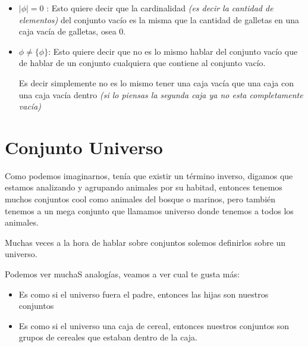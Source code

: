 \documentclass[12pt]{report}                                    %
\begin{document}
        \begin{itemize}
            \item $|\phi| = 0$ : 
                    Esto quiere decir que la cardinalidad \emph{(es decir
                    la cantidad de elementos)} del conjunto vacío es la misma que 
                    la cantidad de galletas en una caja vacía de galletas, osea 0.

            \item $\phi \neq \{\phi\}$: 
                    Esto quiere decir que no es lo mismo hablar del conjunto
                    vacío que de hablar de un conjunto cualquiera que contiene al
                    conjunto vacío.

                    Es decir simplemente no es lo mismo tener una caja vacía que una caja
                    con una caja vacía dentro \emph{(si lo piensas la segunda caja ya 
                    no esta completamente vacía)}
        \end{itemize}


    \clearpage
    \section{Conjunto Universo}
        
        Como podemos imaginarnos, tenía que existir un término inverso, digamos que estamos
        analizando y agrupando animales por su habitad, entonces tenemos muchos conjuntos cool
        como animales del bosque o marinos, pero también tenemos a un mega conjunto que llamamos
        universo donde tenemos a todos los animales.

        Muchas veces a la hora de hablar sobre conjuntos solemos definirlos sobre un universo.

        Podemos ver muchaS analogías, veamos a ver cual te gusta más:

        \begin{itemize}
            \item Es como si el universo fuera el padre, entonces las hijas son nuestros conjuntos
            \item Es como si el universo una caja de cereal, entonces nuestros conjuntos son grupos de cereales
                que estaban dentro de la caja.
        \end{itemize}
\end{document}
